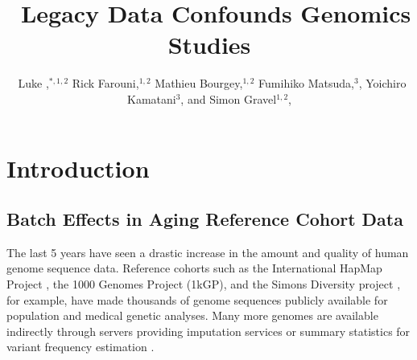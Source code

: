 \documentclass[custompaper]{MBE}%
\begin{document}

\title{\ Legacy Data Confounds Genomics Studies}

\author[Anderson-Trocm\'e et al.]{\ Luke ,$^{\ast,1,2}$ Rick Farouni,$^{1,2}$ Mathieu Bourgey,$^{1,2}$ Fumihiko Matsuda,$^{3}$, Yoichiro Kamatani$^{3}$, and Simon Gravel$^{1,2}$,}

\address{$^{1}$Department of Human Genetics, McGill University, Montreal, QC H3A 0G1, Canada\\
$^{2}$McGill University and Genome Quebec Innovation Centre, Montreal, QC H3A 0G1, Canada\\ 
$^{3}$Center for Genomic Medicine, Graduate School of Medicine, Kyoto University, Kyoto 606-8501, Japan}



\maketitle

\section{Introduction}
	
\subsection{Batch Effects in Aging Reference Cohort Data}			

The last 5 years have seen a drastic increase in the amount and quality of human genome sequence data. 
Reference cohorts such as the International HapMap Project \citep{HapMap2005}, the 1000 Genomes Project (1kGP)\citep{1000GenomesProjectConsortium2010,The1000GenomesProjectConsortium2012,phase3}, and the Simons Diversity project \citep{Mallick2016}, for example, have made thousands of genome sequences publicly available for population and medical genetic analyses. 
Many more genomes are available indirectly through servers providing imputation services \citep{HapMap2005} or summary statistics for variant frequency estimation \citep{Lek2016}.
\end{document}
